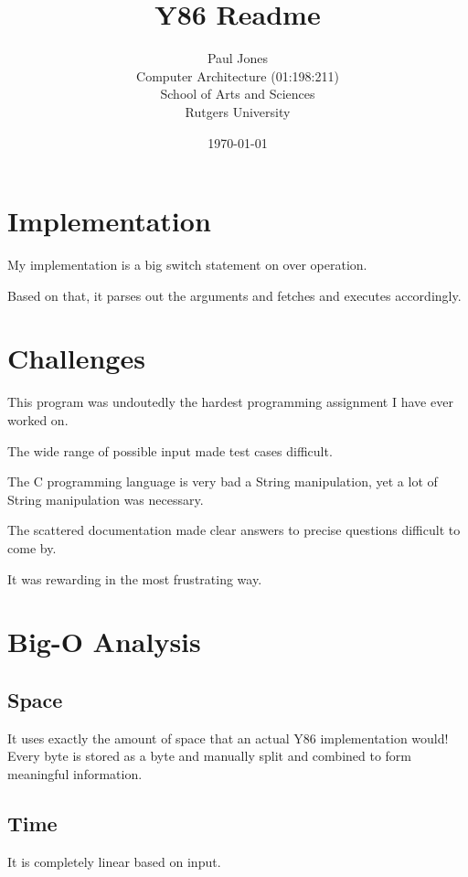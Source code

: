 \documentclass{article}
\title{Y86 Readme}
\date{\today}
\author{Paul Jones\\ Computer Architecture (01:198:211) \\ School of Arts and Sciences \\ Rutgers University}
\begin{document}
\maketitle

\clearpage

\section{Implementation}

My implementation is a big switch statement on over operation.

Based on that, it parses out the arguments and fetches and executes accordingly.

\section{Challenges}

This program was undoutedly the hardest programming assignment I have ever worked on.

The wide range of possible input made test cases difficult.

The C programming language is very bad a String manipulation, yet a lot of String manipulation was necessary.

The scattered documentation made clear answers to precise questions difficult to come by.

It was rewarding in the most frustrating way.

\section{Big-O Analysis}

\subsection{Space}

It uses exactly the amount of space that an actual Y86 implementation would!
Every byte is stored as a byte and manually split and combined to form meaningful information.

\subsection{Time}

It is completely linear based on input.
\end{document}
